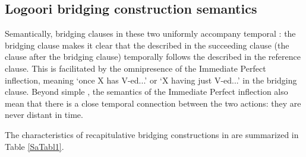 \documentclass[output=paper]{LSP/langsci}
\begin{document}
\subsection{Logoori bridging construction semantics}
\label{Sasemantics}
Semantically,  bridging clauses in these two  uniformly accompany temporal : the bridging clause makes it clear that the  described in the succeeding clause (the clause after the bridging clause) temporally follows the  described in the reference clause. This is facilitated by the omnipresence of the Immediate Perfect inflection, meaning `once X has V-ed...' or `X having just V-ed...' in the bridging clause. Beyond simple , the semantics of the Immediate Perfect inflection also mean that there is a close temporal connection between the two actions: they are never distant in time.

The characteristics of  recapitulative bridging constructions in  are summarized in Table \ref{SaTabl1}.
\end{document}
